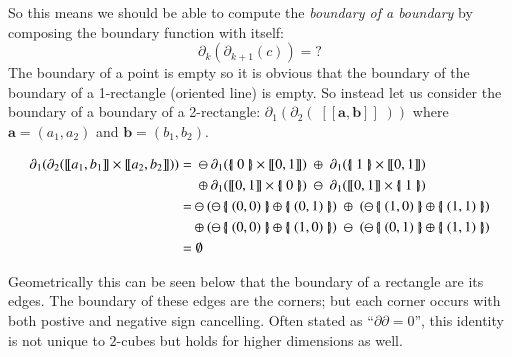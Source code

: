 So this means we should be able to compute the \emph{boundary of a boundary} 
by composing the boundary function with itself:
\begin{equation*}
	\partial_k ( \partial_{k+1} (c)) = ?
\end{equation*}
The boundary of a point is empty so it is obvious that the boundary of the boundary of a 1-rectangle (oriented line) 
is empty.
So instead let us consider the boundary of a boundary of a 2-rectangle: 
$\partial_1 ( \partial_2 ( \; [\![\boldsymbol{a}, \boldsymbol{b} ]\!] \; ) )$
where $\boldsymbol{a} =(a_1,a_2)$ and $\boldsymbol{b}= (b_1,b_2)$.



\begin{align}
	\partial_1 ( \partial_2 ( [\![ a_1 , b_1 ]\!] \times [\![a_2, b_2 ]\!] ) )
	=	& 	\; \ominus 	\partial_1( \hset{0} \times [\![0,1]\!]) 
			\; \oplus \; 	\partial_1(\hset{1} \times [\![0,1]\!]) \notag \\
		& 	\; \oplus 	\partial_1( [\![0,1]\!] \times \hset{0}) 
			\; \ominus \; \partial_1([\![0,1]\!] \times \hset{1}) \\
	=	& 	\ominus	( 	\ominus \hset{(0,0)} \oplus \hset{(0,1)} ) 
			\;\oplus\;(	\ominus \hset{(1,0)} \oplus \hset{(1,1)}) \notag \\
		& 	\oplus ( 		\ominus \hset{(0,0)} \oplus \hset{(1,0)} ) 
			\;\ominus\;(	\ominus \hset{(0,1)} \oplus \hset{(1,1)}) \\
	=	& \;\emptyset	
\end{align}

Geometrically this can be seen below that the boundary of a rectangle are its edges.
The boundary of these edges are the corners; but each corner occurs with both postive and negative sign cancelling.
Often stated as ``$\partial \partial = 0$'', this identity is not unique to $2$-cubes but holds for higher dimensions as well.


